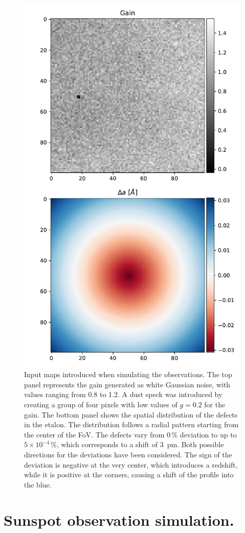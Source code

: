\begin{figure}
    \begin{minipage}[c]{0.5\textwidth}
        \includegraphics[width=\textwidth]{figures/EtalonPaper/Gain_Da_Inputs.pdf}
    \end{minipage}\hfill
    \begin{minipage}[c]{0.47\textwidth}
        \caption{
            Input maps introduced when simulating the observations. The top panel represents the gain generated as white Gaussian noise, with values ranging from 0.8 to 1.2. A dust speck was introduced by creating a group of four pixels with low values of $g=0.2$ for the gain. The bottom panel shows the spatial distribution of the defects in the etalon. The distribution follows a radial pattern starting from the center of the FoV. The defects vary from $0\,\%$ deviation to up to $5\times 10 ^{-4}\,\%$, which corresponds to a shift of 3~pm. Both possible directions for the deviations have been considered. The sign of the deviation is negative at the very center, which introduces a redshift, while it is positive at the corners, causing a shift of the profile into the blue.
        } \label{fig_etalon_corr: Inputs}
    \end{minipage}
    \end{figure}




\section{Sunspot observation simulation.}
